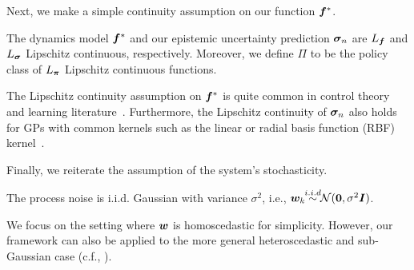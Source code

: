 Next, we make a simple continuity assumption on our function ${\bm{f}}^*$.
\begin{assumption}
\label{ass:lipschitz_continuity}
The dynamics model ${\bm{f}}^*$ and our epistemic uncertainty prediction ${\bm{\sigma}}_n$ are $L_{{\bm{f}}}$ and $L_{{\bm{\sigma}}}$ Lipschitz continuous, respectively. Moreover,
we define $\Pi$ to be the policy class of $L_{{\bm{\pi}}}$ Lipschitz continuous functions. 
\end{assumption}
The Lipschitz continuity assumption on ${\bm{f}}^*$ is quite common in control theory~\citep{khalil2015nonlinear} and learning literature~\citep{curi2020efficient,pasztor2021efficient,sussex2022model}. Furthermore, the Lipschitz continuity of ${\bm{\sigma}}_n$ also holds for GPs with common kernels such as the linear or radial basis function (RBF) kernel~\citep{rothfuss2023hallucinated}.

Finally, we reiterate the assumption of the system's stochasticity.
\begin{assumption}
The process noise is i.i.d. Gaussian with variance $\sigma^2$, i.e., $\vw_k \stackrel{\mathclap{i.i.d}}{\sim} \setN(\vzero, \sigma^2\mI)$.
\label{ass:noise_properties}
\end{assumption}
We focus on the setting where ${\bm{w}}$ is homoscedastic for simplicity. However, our framework can also be applied to the more general heteroscedastic and sub-Gaussian case (c.f., ).






